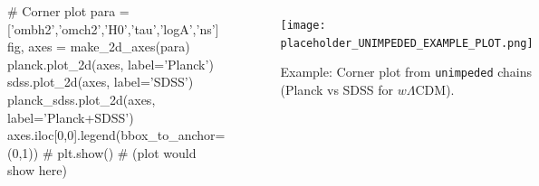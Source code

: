 \documentclass[aspectratio=169]{beamer}
\begin{document}
\begin{frame}[fragile]
\begin{columns}[T]
\begin{pythonhighlight}
# Corner plot
para = ['ombh2','omch2','H0','tau','logA','ns']
fig, axes = make_2d_axes(para)
planck.plot_2d(axes, label='Planck')
sdss.plot_2d(axes, label='SDSS')
planck_sdss.plot_2d(axes, label='Planck+SDSS')
axes.iloc[0,0].legend(bbox_to_anchor=(0,1))
# plt.show() # (plot would show here)
        \end{pythonhighlight}
        \begin{figure}
            \centering
            \texttt{[image: placeholder\_UNIMPEDED\_EXAMPLE\_PLOT.png]}
            \caption{Example: Corner plot from \texttt{unimpeded} chains (Planck vs SDSS for $w\Lambda$CDM).}
        \end{figure}
    \end{columns}
\end{frame}
\end{document}
